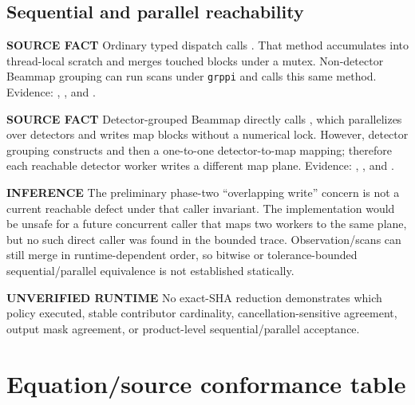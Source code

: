 \documentclass[10pt]{article}
\newcommand{\srclabel}{\textbf{SOURCE FACT}}
\newcommand{\inflabel}{\textbf{INFERENCE}}
\newcommand{\runlabel}{\textbf{UNVERIFIED RUNTIME}}
\begin{document}
\subsection{Sequential and parallel reachability}

\srclabel{} Ordinary typed dispatch calls .  That
method accumulates into thread-local scratch and merges touched blocks under a
mutex.  Non-detector Beammap grouping can run scans under \texttt{grppi} and
calls this same method.  Evidence: ,
, and
.

\srclabel{} Detector-grouped Beammap directly calls
, which parallelizes over detectors and
writes map blocks without a numerical lock.  However, detector grouping
constructs  and then a one-to-one
detector-to-map mapping; therefore each reachable detector worker writes a
different map plane.  Evidence:
,
, and
.

\inflabel{} The preliminary phase-two ``overlapping write'' concern is not a
current reachable defect under that caller invariant.  The implementation
would be unsafe for a future concurrent caller that maps two workers to the
same plane, but no such direct caller was found in the bounded trace.
Observation/scans can still merge in runtime-dependent order, so bitwise or
tolerance-bounded sequential/parallel equivalence is not established
statically.

\runlabel{} No exact-SHA reduction demonstrates which policy executed, stable
contributor cardinality, cancellation-sensitive agreement, output mask
agreement, or product-level sequential/parallel acceptance.

\section{Equation/source conformance table}
\end{document}
